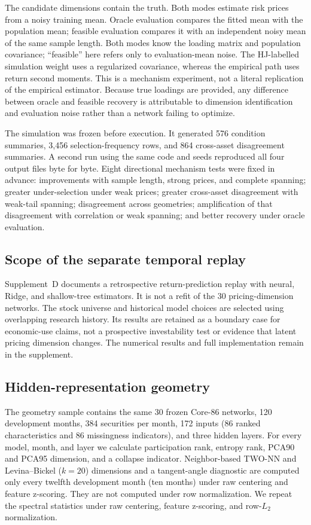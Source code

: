 The candidate dimensions contain the truth. Both modes estimate risk prices from a noisy training mean. Oracle evaluation compares the fitted mean with the population mean; feasible evaluation compares it with an independent noisy mean of the same sample length. Both modes know the loading matrix and population covariance; ``feasible'' here refers only to evaluation-mean noise. The HJ-labelled simulation weight uses a regularized covariance, whereas the empirical path uses return second moments. This is a mechanism experiment, not a literal replication of the empirical estimator. Because true loadings are provided, any difference between oracle and feasible recovery is attributable to dimension identification and evaluation noise rather than a network failing to optimize.

The simulation was frozen before execution. It generated 576 condition summaries, 3,456 selection-frequency rows, and 864 cross-asset disagreement summaries. A second run using the same code and seeds reproduced all four output files byte for byte. Eight directional mechanism tests were fixed in advance: improvements with sample length, strong prices, and complete spanning; greater under-selection under weak prices; greater cross-asset disagreement with weak-tail spanning; disagreement across geometries; amplification of that disagreement with correlation or weak spanning; and better recovery under oracle evaluation.

\subsection{Scope of the separate temporal replay}

Supplement~D documents a retrospective return-prediction replay with neural, Ridge, and shallow-tree estimators. It is not a refit of the 30 pricing-dimension networks. The stock universe and historical model choices are selected using overlapping research history. Its results are retained as a boundary case for economic-use claims, not a prospective investability test or evidence that latent pricing dimension changes. The numerical results and full implementation remain in the supplement.

\subsection{Hidden-representation geometry}

The geometry sample contains the same 30 frozen Core-86 networks, 120 development months, 384 securities per month, 172 inputs (86 ranked characteristics and 86 missingness indicators), and three hidden layers. For every model, month, and layer we calculate participation rank, entropy rank, PCA90 and PCA95 dimension, and a collapse indicator. Neighbor-based TWO-NN and Levina--Bickel ($k=20$) dimensions and a tangent-angle diagnostic are computed only every twelfth development month (ten months) under raw centering and feature z-scoring. They are not computed under row normalization. We repeat the spectral statistics under raw centering, feature z-scoring, and row-$L_2$ normalization.


